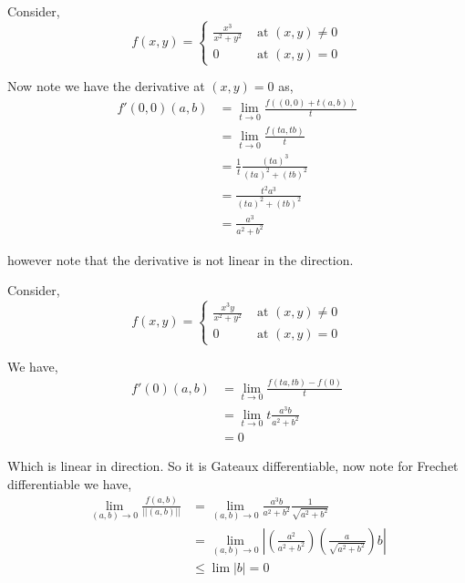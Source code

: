 \begin{eg}
    Consider, 
    \[
        f(x, y) = \begin{cases}
            \frac{x^{3}}{x^2 + y^2} & \text{ at }(x, y)  \ne 0\\
            0 & \text{ at }(x, y) = 0
        \end{cases}
    \]

    Now note we have the derivative at $(x, y) = 0$ as, 
    \begin{align*}
        f'(0, 0) (a, b) &= \lim_{t \to 0} \frac{f((0, 0) + t(a, b))}{t}\\
                        &= \lim_{t \to 0} \frac{f(ta, tb)}{t}\\
                        &= \frac{1}{t}\frac{(ta)^{3}}{(ta)^2 + (tb)^2}\\
                        &= \frac{t^2a^{3}}{(ta)^2 + (tb)^2}\\
                        &=  \frac{a^{3}}{a^2 + b^2}
    \end{align*}

    however note that the derivative is not linear in the direction.
\end{eg}
\begin{eg}
    Consider, 
    \[
        f(x, y) = \begin{cases}
            \frac{x^{3} y}{x^2 + y^2} & \text{ at }(x,y) \ne 0\\
                                      0& \text{ at }(x, y) = 0
        \end{cases}
    \]

    We have, 
    \begin{align*}
        f'(0)(a, b) &= \lim_{t \to 0} \frac{f(ta, tb) - f(0)}{t}\\
                    &= \lim_{t \to 0} t \frac{a^{3}b}{a^2 + b^2}\\
                    &= 0
    \end{align*}

    Which is linear in direction. So it is Gateaux differentiable, now note for Frechet differentiable we have, 
    \begin{align*}
        \lim_{(a, b) \to 0}  \frac{f(a, b)}{\left | \left | (a, b)\right |\right |} &= \lim_{(a, b) \to 0}  \frac{a^{3}b}{a^2 + b^2} \frac{1}{\sqrt{a^2 + b^2}} \\
                                                                                    &= \lim_{(a, b) \to 0} \left | \left ( \frac{a^2}{a^2 + b^2} \right)\left ( \frac{a}{\sqrt{a^2 + b^2}}\right )b\right |\\
                                                                                    &\le \lim |b| = 0
    \end{align*}
\end{eg}


